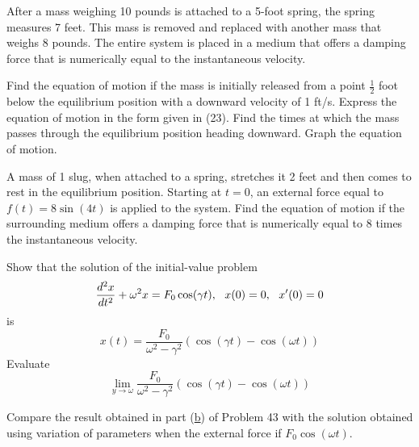 \documentclass[12pt]{report}
\begin{document}
\begin{enumerate}[label=\arabic*.,start=3]
	\setcounter{enumi}{29}
	\problem After a mass weighing 10 pounds is attached to a 5-foot spring, the spring measures 7 feet. This mass is removed and replaced with another mass that weighs 8 pounds. The entire system is placed in a medium that offers a damping force that is numerically equal to the instantaneous velocity.
	\begin{enumerate}[label=(\alph*)]
	    \subproblem Find the equation of motion if the mass is initially released from a point $\frac{1}{2}$ foot below the equilibrium position with a downward velocity of 1 ft/s.
		\subproblem Express the equation of motion in the form given in (23).
		\subproblem Find the times at which the mass passes through the equilibrium position heading downward.
		\subproblem Graph the equation of motion.
	\end{enumerate}
	\setcounter{enumi}{34}
	\problem A mass of 1 slug, when attached to a spring, stretches it 2 feet and then comes to rest in the equilibrium position. Starting at $t=0$, an external force equal to $f(t)=8\sin(4t)$ is applied to the system. Find the equation of motion if the surrounding medium offers a damping force that is numerically equal to 8 times the instantaneous velocity.
	\setcounter{enumi}{42}
	\problem 
	\begin{enumerate}[label=(\alph*)]
	    \subproblem Show that the solution of the initial-value problem \[ \frac{d^{2}x}{dt^{2}} + \omega^{2}x = F_{0}\cos(\gamma t),\mbox{{ }{ }} x(0)=0,\mbox{{ }{ }} x'(0)=0 \] is \[ x(t) = \frac{F_{0}}{\omega^{2} - \gamma^{2}}(\cos(\gamma t) - \cos(\omega t)) \]
		\subproblem Evaluate \[ \lim_{y\rightarrow \omega} \frac{F_{0}}{\omega^{2} - \gamma^{2}}(\cos(\gamma t) - \cos(\omega t)) \]
	\end{enumerate}
	\problem Compare the result obtained in part (\hyperref[prb:43b]{b}) of Problem 43 with the solution obtained using variation of parameters when the external force if $F_{0}\cos(\omega t)$.
\end{enumerate}
\end{document}
